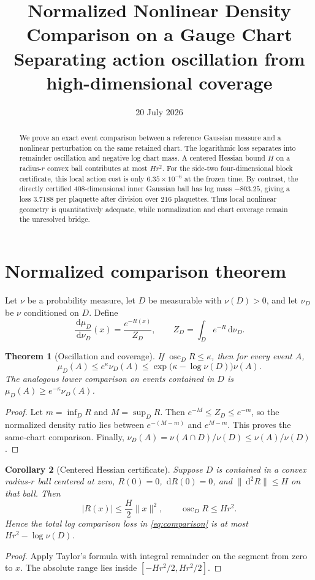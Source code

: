 \documentclass[11pt]{article}
\title{Normalized Nonlinear Density Comparison on a Gauge Chart\\
\large Separating action oscillation from high-dimensional coverage}
\author{}
\date{20 July 2026}
\newtheorem{theorem}{Theorem}[section]
\newtheorem{corollary}[theorem]{Corollary}
\newcommand{\dd}{\,\mathrm d}
\begin{document}
\maketitle

\begin{abstract}
We prove an exact event comparison between a reference Gaussian measure and a
nonlinear perturbation on the same retained chart.  The logarithmic loss
separates into remainder oscillation and negative log chart mass.  A centered
Hessian bound $H$ on a radius-$r$ convex ball contributes at most $Hr^2$.
For the side-two four-dimensional block certificate, this local action cost is
only $6.35\times10^{-6}$ at the frozen time.  By contrast, the directly
certified 408-dimensional inner Gaussian ball has log mass $-803.25$, giving a
loss $3.7188$ per plaquette after division over 216 plaquettes.  Thus local
nonlinear geometry is quantitatively adequate, while normalization and chart
coverage remain the unresolved bridge.
\end{abstract}

\section{Normalized comparison theorem}

Let $\nu$ be a probability measure, let $D$ be measurable with $\nu(D)>0$,
and let $\nu_D$ be $\nu$ conditioned on $D$.  Define
\[
 \frac{\dd\mu_D}{\dd\nu_D}(x)=\frac{e^{-R(x)}}{Z_D},
 \qquad Z_D=\int_D e^{-R}\dd\nu_D.
\]

\begin{theorem}[Oscillation and coverage]
If $\operatorname{osc}_D R\leq\kappa$, then for every event $A$,
\begin{equation}
 \mu_D(A)\leq e^\kappa\nu_D(A)
 \leq \exp\!\bigl(\kappa-\log\nu(D)\bigr)\nu(A).
 \label{eq:comparison}
\end{equation}
The analogous lower comparison on events contained in $D$ is
$\mu_D(A)\geq e^{-\kappa}\nu_D(A)$.
\end{theorem}
\begin{proof}
Let $m=\inf_D R$ and $M=\sup_D R$.  Then
$e^{-M}\leq Z_D\leq e^{-m}$, so the normalized density ratio lies between
$e^{-(M-m)}$ and $e^{M-m}$.  This proves the same-chart comparison.  Finally,
$\nu_D(A)=\nu(A\cap D)/\nu(D)\leq\nu(A)/\nu(D)$.
\end{proof}

\begin{corollary}[Centered Hessian certificate]
Suppose $D$ is contained in a convex radius-$r$ ball centered at zero,
$R(0)=0$, $\dd R(0)=0$, and $\|\dd^2R\|\leq H$ on that ball.  Then
\[
 |R(x)|\leq\frac{H}{2}\|x\|^2,
 \qquad \operatorname{osc}_D R\leq Hr^2.
\]
Hence the total log comparison loss in \eqref{eq:comparison} is at most
$Hr^2-\log\nu(D)$.
\end{corollary}
\begin{proof}
Apply Taylor's formula with integral remainder on the segment from zero to
$x$.  The absolute range lies inside $[-Hr^2/2,Hr^2/2]$.
\end{proof}
\end{document}
